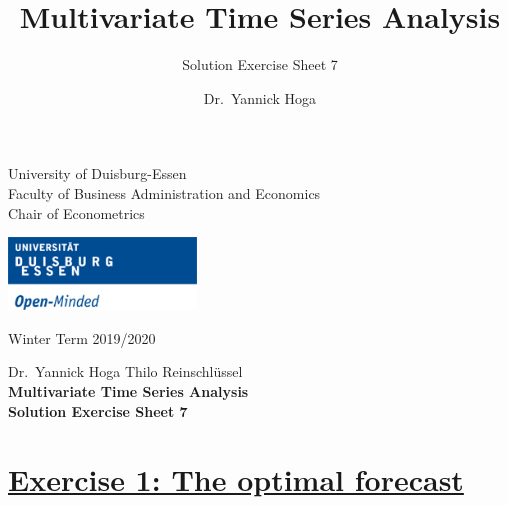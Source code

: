 \documentclass[12pt,a4paper]{article}
\title{Multivariate Time Series Analysis}
\subtitle{Solution Exercise Sheet 7}
\author{Dr.~Yannick Hoga}
\date{}
\newcommand{\tmpsection}[1]{}
\let\tmpsection=\section
\renewcommand{\section}[1]{\tmpsection{\underline{#1}} }
\begin{document}





\restoregeometry



\begin{minipage}{0.6\textwidth}
University of Duisburg-Essen\\
Faculty of Business Administration and Economics\\
Chair of Econometrics\\
\end{minipage}

	\begin{flushright}
	\vspace{-3cm}
	\includegraphics*[width=5cm]{../Includes/duelogo_en.png}\\
	\vspace{.125cm}
	\end{flushright}
\hspace{-0.005cm}Winter Term 2019/2020

\vspace{0.05cm}

\begin{center}
	\vspace{.25cm}
	Dr.~Yannick Hoga \hspace{.5cm} Thilo Reinschlüssel \\
	\vspace{.25cm}
	\textbf{\Large{Multivariate Time Series Analysis}}\\
	\vspace{.25cm}
	\textbf{\large{Solution Exercise Sheet 7}}\\
	\vspace{.125cm}
\end{center}





\hypertarget{exercise-1-the-optimal-forecast}{%
\section{Exercise 1: The optimal
forecast}\label{exercise-1-the-optimal-forecast}}
\end{document}
